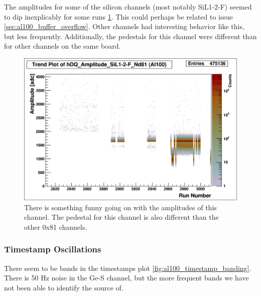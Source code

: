 \documentclass[a4paper]{article}
\begin{document}
The amplitudes for some of the silicon channels (most notably SiL1-2-F) seemed to dip inexplicably
for some runs \ref{fig:al100_sil12f_amps}.
This could perhaps be related to issue \ref{sec:al100_buffer_overflow}. Other channels
had interesting behavior like this, but less frequently. Additionally, the pedestals
for this channel were different than for other channels on the same board.

\begin{figure}
  \includegraphics[width=0.9\linewidth]{figs/al100/sil12f_amp}
  \caption{There is something funny going on with the amplitudes of this channel.
    The pedestal for this channel is also different than the other 0x81 channels.}
  \label{fig:al100_sil12f_amps}
\end{figure}


\subsubsection{Timestamp Oscillations}
\label{sec:al100_timestamp_oscillations}

There seem to be bands in the timestamps plot \ref{fig:al100_timestamp_banding}.
There is 50 Hz noise in the Ge-S channel, but the more frequent bands
we have not been able to identify the source of.
\end{document}
